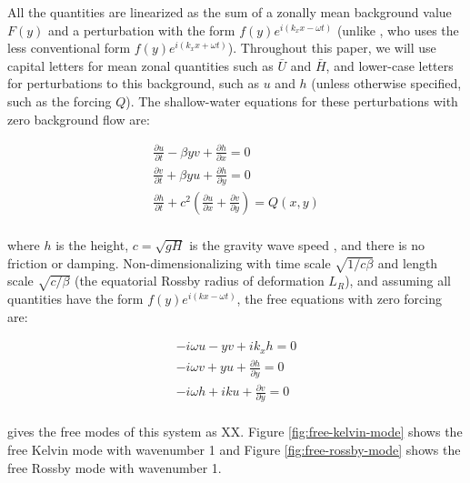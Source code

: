 All the quantities are linearized as the sum of a zonally mean background value $F(y)$  and a perturbation with the form  $f(y) e^{i( k_{x} x-\omega t)}$ (unlike \citet{matsuno1966quasi}, who uses the less conventional form  $f(y) e^{i( k_{x} x+\omega t)}$). Throughout this paper, we will use capital letters for mean zonal quantities such as $\bar{U}$ and $\bar{H}$, and lower-case letters for perturbations to this background, such as $u$ and $h$ (unless otherwise specified, such as the forcing $Q$). The shallow-water equations for these perturbations with zero background flow are:

\begin{equation}\label{eqn:sw-eqns-1}
  \begin{gathered}
     \frac{\partial u}{\partial t} - \beta y v +\frac{\partial h}{\partial x} = 0 \\
      \frac{\partial v}{\partial t} + \beta y u + \frac{\partial h}{\partial y} = 0 \\
    \frac{\partial h}{\partial t} +c^{2}(\frac{\partial u}{\partial x} + \frac{\partial v}{\partial y}) = Q(x,y) \\
  \end{gathered}
\end{equation}

where $h$ is the height, $c = \sqrt{gH}$ is the gravity wave speed \citep{matsuno1966quasi}, and there is no friction or damping. Non-dimensionalizing with time scale $\sqrt{1/c \beta}$ and length scale $\sqrt{c/\beta}$ (the equatorial Rossby radius of deformation $L_{R}$), and assuming all quantities have the form $f(y) e^{i( k x-\omega t)}$, the free equations with zero forcing are:

\begin{equation}\label{eqn:sw-eqns-2}
  \begin{gathered}
      - i \omega u - y v + i k_{x} h = 0 \\
      - i \omega v + y u + \frac{\partial h}{\partial y} = 0 \\
      - i \omega h + i k u + \frac{\partial v}{\partial y} = 0 \\
  \end{gathered}
\end{equation}

\citet{matsuno1966quasi} gives the free modes of this system as XX. Figure \ref{fig:free-kelvin-mode} shows the free Kelvin mode with wavenumber 1 and Figure \ref{fig:free-rossby-mode} shows the free Rossby mode with wavenumber 1.

